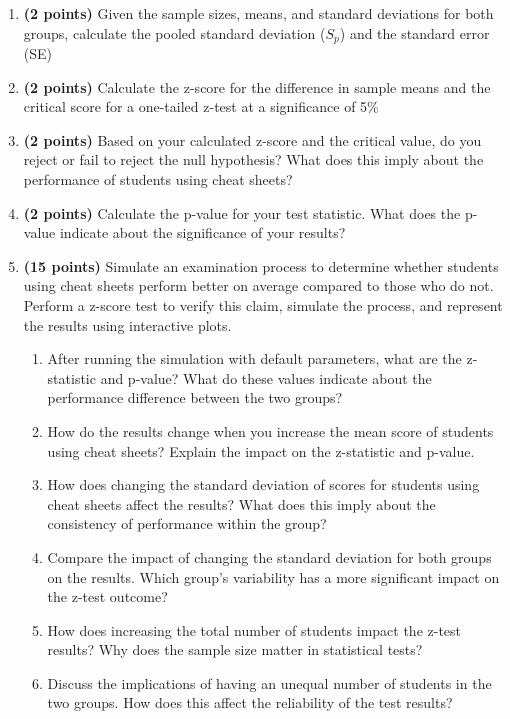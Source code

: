 \documentclass[a3paper,12pt]{extarticle} %
\begin{document}
\begin{enumerate}
    \item \textbf{(2 points)} Given the sample sizes, means, and standard deviations for both groups, calculate the
    pooled standard deviation (\(S_p\)) and the standard error (SE)
    \item \textbf{(2 points)} Calculate the z-score for the difference in sample means and the critical score for a
    one-tailed z-test at a significance of 5\%
    \item \textbf{(2 points)} Based on your calculated z-score and the critical value, do you reject or fail to reject
    the null hypothesis? What does this imply about the performance of students using cheat sheets?
    \item \textbf{(2 points)} Calculate the p-value for your test statistic. What does the p-value indicate about the
    significance of your results?
    \item \textbf{(15 points)} Simulate an examination process to determine whether students using cheat sheets
    perform better on average compared to those who do not. Perform a z-score test to verify this
    claim, simulate the process, and represent the results using interactive plots.
    \begin{enumerate}
        \item After running the simulation with default parameters, what are the z-statistic and p-value?
        What do these values indicate about the performance difference between the two groups?
        \item How do the results change when you increase the mean score of students using cheat sheets?
        Explain the impact on the z-statistic and p-value.
        \item How does changing the standard deviation of scores for students using cheat sheets affect the
        results? What does this imply about the consistency of performance within the group?
        \item Compare the impact of changing the standard deviation for both groups on the results. Which
        group’s variability has a more significant impact on the z-test outcome?
        \item How does increasing the total number of students impact the z-test results? Why does the
        sample size matter in statistical tests?
        \item Discuss the implications of having an unequal number of students in the two groups. How
        does this affect the reliability of the test results?
    \end{enumerate}
\end{enumerate}
\end{document}
